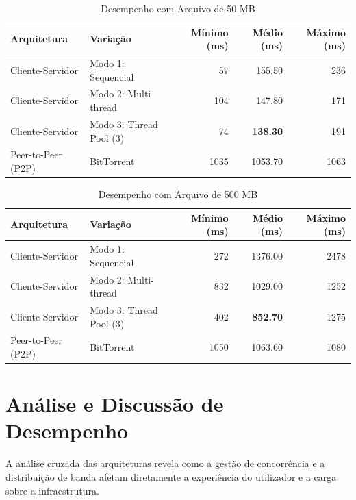 \documentclass[12pt, a4paper]{article}
\begin{document}
\begin{table}[h]
    \centering
    \caption{Desempenho com Arquivo de 50 MB}
    \begin{tabular}{llrrr}
        \toprule
        \textbf{Arquitetura} & \textbf{Variação} & \textbf{Mínimo (ms)} & \textbf{Médio (ms)} & \textbf{Máximo (ms)} \\
        \midrule
        Cliente-Servidor & Modo 1: Sequencial & 57 & 155.50 & 236 \\
        Cliente-Servidor & Modo 2: Multi-thread & 104 & 147.80 & 171 \\
        Cliente-Servidor & Modo 3: Thread Pool (3) & 74 & \textbf{138.30} & 191 \\
        Peer-to-Peer (P2P) & BitTorrent & 1035 & 1053.70 & 1063 \\
        \bottomrule
    \end{tabular}
\end{table}

\begin{table}[h]
    \centering
    \caption{Desempenho com Arquivo de 500 MB}
    \begin{tabular}{llrrr}
        \toprule
        \textbf{Arquitetura} & \textbf{Variação} & \textbf{Mínimo (ms)} & \textbf{Médio (ms)} & \textbf{Máximo (ms)} \\
        \midrule
        Cliente-Servidor & Modo 1: Sequencial & 272 & 1376.00 & 2478 \\
        Cliente-Servidor & Modo 2: Multi-thread & 832 & 1029.00 & 1252 \\
        Cliente-Servidor & Modo 3: Thread Pool (3) & 402 & \textbf{852.70} & 1275 \\
        Peer-to-Peer (P2P) & BitTorrent & 1050 & 1063.60 & 1080 \\
        \bottomrule
    \end{tabular}
\end{table}

\section{Análise e Discussão de Desempenho}

A análise cruzada das arquiteturas revela como a gestão de concorrência e a distribuição de banda afetam diretamente a experiência do utilizador e a carga sobre a infraestrutura.
\end{document}
